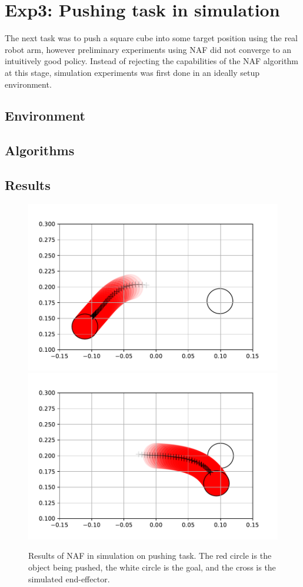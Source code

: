 \section{Exp3: Pushing task in simulation}
The next task was to push a square cube into some target position using
the real robot arm, however preliminary experiments using NAF did not
converge to an intuitively good policy. Instead of rejecting the capabilities
of the NAF algorithm at this stage, simulation experiments was first done in
an ideally setup environment.

\subsection{Environment}

\subsection{Algorithms}

\subsection{Results}

\begin{figure}[h!]
    \centering
    \includegraphics[width=0.4 \textwidth]{res/naf_sim_failure_mode.pdf}
    \includegraphics[width=0.4 \textwidth]{res/naf_sim_failure_mode_ideal.pdf}

    \caption{Results of NAF in simulation on pushing task. The red circle is
    the object being pushed, the white circle is the goal, and the cross is the
    simulated end-effector.}

    \label{fig:naf_sim_failure}
\end{figure}

